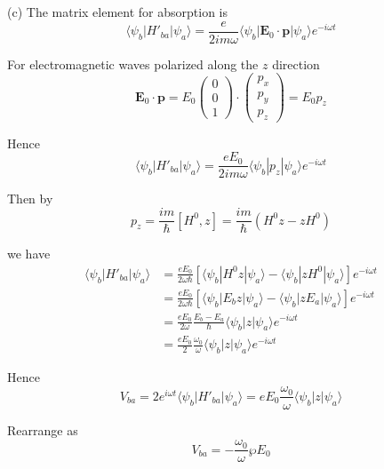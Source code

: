 (c) The matrix element for absorption is
\begin{equation*}
\langle\psi_b|H'_{ba}|\psi_a\rangle
=\frac{e}{2im\omega}\langle\psi_b|\mathbf E_0\cdot\mathbf p|\psi_a\rangle e^{-i\omega t}
\end{equation*}

For electromagnetic waves
polarized along the $z$ direction
\begin{equation*}
\mathbf E_0\cdot\mathbf p
=E_0\begin{pmatrix}0\\0\\1\end{pmatrix}
\cdot\begin{pmatrix}p_x\\p_y\\p_z\end{pmatrix}
=E_0p_z
\end{equation*}

Hence
\begin{equation*}
\langle\psi_b|H'_{ba}|\psi_a\rangle
=\frac{eE_0}{2im\omega}\langle\psi_b|p_z|\psi_a\rangle e^{-i\omega t}
\end{equation*}

Then by
\begin{equation*}
p_z=\frac{im}{\hbar}[H^0,z]
=\frac{im}{\hbar}(H^0z-zH^0)
\end{equation*}

we have
\begin{align*}
\langle\psi_b|H'_{ba}|\psi_a\rangle
&=\frac{eE_0}{2\omega\hbar}
\left[\langle\psi_b|H^0z|\psi_a\rangle-\langle\psi_b|zH^0|\psi_a\rangle\right]
e^{-i\omega t}
\\[1ex]
&=\frac{eE_0}{2\omega\hbar}
\left[\langle\psi_b|E_bz|\psi_a\rangle-\langle\psi_b|zE_a|\psi_a\rangle\right]
e^{-i\omega t}
\\[1ex]
&=\frac{eE_0}{2\omega}\frac{E_b-E_a}{\hbar}
\langle\psi_b|z|\psi_a\rangle
e^{-i\omega t}
\\[1ex]
&=\frac{eE_0}{2}\frac{\omega_0}{\omega}
\langle\psi_b|z|\psi_a\rangle
e^{-i\omega t}
\end{align*}

Hence
\begin{equation*}
V_{ba}=2e^{i\omega t}\langle\psi_b|H'_{ba}|\psi_a\rangle
=eE_0\frac{\omega_0}{\omega}
\langle\psi_b|z|\psi_a\rangle
\end{equation*}

Rearrange as
\begin{equation*}
V_{ba}=-\frac{\omega_0}{\omega}\wp E_0
\end{equation*}

